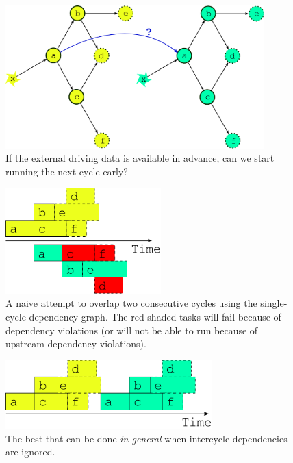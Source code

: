 \documentclass[11pt,a4paper]{article}
\begin{document}
\begin{figure} \label{fig-dep-two-linked}
    \begin{center}
        \includegraphics[width=10cm]{inkscape-svg/dep-two-cycles-linked} 
    \end{center}
    \caption[What if the external data is available early?]{\small If
    the external driving data is available in advance, can we start
    running the next cycle early?} 
\end{figure}

\begin{figure} \label{fig-overlap}
    \begin{center}
        \includegraphics[width=6cm]{inkscape-svg/timeline-one-c} 
    \end{center}
    \caption[Attempted overlap of consective single-cycle job
    schedules]{\small A naive attempt to overlap two consecutive cycles
    using the single-cycle dependency graph. The red shaded tasks will
    fail because of dependency violations (or will not be able to run
    because of upstream dependency violations).} 
\end{figure} 

\begin{figure} \label{fig-job-no-overlap}
    \begin{center}
        \includegraphics[width=8cm]{inkscape-svg/timeline-one-a} 
    \end{center}
    \caption[The only safe multicycle job schedule?]{\small The best that
    can be done {\em in general} when intercycle dependencies are
    ignored.} 
\end{figure} 
\end{document}
